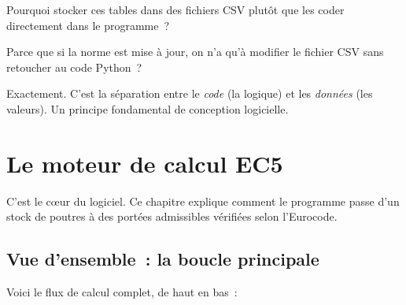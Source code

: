 \documentclass[12pt, a4paper, openany]{book}
\begin{document}
\begin{maitre}
Pourquoi stocker ces tables dans des fichiers CSV plut\^ot que les coder
directement dans le programme~?
\end{maitre}

\begin{apprenti}
Parce que si la norme est mise \`a jour, on n'a qu'\`a modifier le fichier
CSV sans retoucher au code Python~?
\end{apprenti}

\begin{maitre}
Exactement. C'est la s\'eparation entre le \emph{code} (la logique) et
les \emph{donn\'ees} (les valeurs). Un principe fondamental de conception
logicielle.
\end{maitre}

\chapter{Le moteur de calcul EC5}

C'est le c\oe{}ur du logiciel. Ce chapitre explique comment le programme
passe d'un stock de poutres \`a des port\'ees admissibles v\'erifi\'ees
selon l'Eurocode.

\section{Vue d'ensemble~: la boucle principale}

Voici le flux de calcul complet, de haut en bas~:
\end{document}
